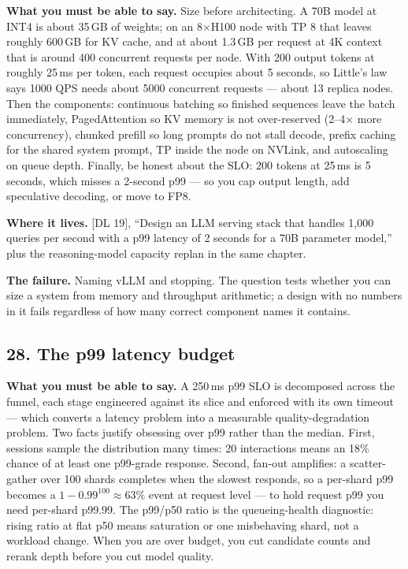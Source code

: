 \textbf{What you must be able to say.} Size before architecting. A 70B model at INT4 is about 35\,GB of weights; on an 8$\times$H100 node with TP 8 that leaves roughly 600\,GB for KV cache, and at about 1.3\,GB per request at 4K context that is around 400 concurrent requests per node. With 200 output tokens at roughly 25\,ms per token, each request occupies about 5 seconds, so Little's law says 1000 QPS needs about 5000 concurrent requests --- about 13 replica nodes. Then the components: continuous batching so finished sequences leave the batch immediately, PagedAttention so KV memory is not over-reserved (2--4$\times$ more concurrency), chunked prefill so long prompts do not stall decode, prefix caching for the shared system prompt, TP inside the node on NVLink, and autoscaling on queue depth. Finally, be honest about the SLO: 200 tokens at 25\,ms is 5 seconds, which misses a 2-second p99 --- so you cap output length, add speculative decoding, or move to FP8.

\textbf{Where it lives.} [DL 19], ``Design an LLM serving stack that handles 1,000 queries per second with a p99 latency of 2 seconds for a 70B parameter model,'' plus the reasoning-model capacity replan in the same chapter.

\textbf{The failure.} Naming vLLM and stopping. The question tests whether you can size a system from memory and throughput arithmetic; a design with no numbers in it fails regardless of how many correct component names it contains.

\subsection*{28. The p99 latency budget}

\textbf{What you must be able to say.} A 250\,ms p99 SLO is decomposed across the funnel, each stage engineered against its slice and enforced with its own timeout --- which converts a latency problem into a measurable quality-degradation problem. Two facts justify obsessing over p99 rather than the median. First, sessions sample the distribution many times: 20 interactions means an 18\% chance of at least one p99-grade response. Second, fan-out amplifies: a scatter-gather over 100 shards completes when the slowest responds, so a per-shard p99 becomes a $1 - 0.99^{100} \approx 63\%$ event at request level --- to hold request p99 you need per-shard p99.99. The p99/p50 ratio is the queueing-health diagnostic: rising ratio at flat p50 means saturation or one misbehaving shard, not a workload change. When you are over budget, you cut candidate counts and rerank depth before you cut model quality.

